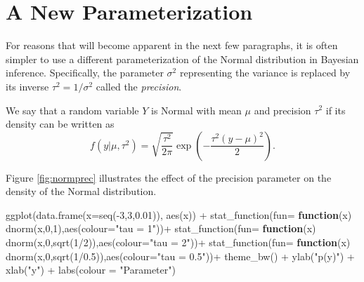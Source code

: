 \documentclass[
]{book}
\newenvironment{Shaded}{\begin{snugshade}}{\end{snugshade}}
\newcommand{\AttributeTok}[1]{\textcolor[rgb]{0.77,0.63,0.00}{#1}}
\newcommand{\ControlFlowTok}[1]{\textcolor[rgb]{0.13,0.29,0.53}{\textbf{#1}}}
\newcommand{\DecValTok}[1]{\textcolor[rgb]{0.00,0.00,0.81}{#1}}
\newcommand{\FloatTok}[1]{\textcolor[rgb]{0.00,0.00,0.81}{#1}}
\newcommand{\FunctionTok}[1]{\textcolor[rgb]{0.00,0.00,0.00}{#1}}
\newcommand{\NormalTok}[1]{#1}
\newcommand{\SpecialCharTok}[1]{\textcolor[rgb]{0.00,0.00,0.00}{#1}}
\newcommand{\StringTok}[1]{\textcolor[rgb]{0.31,0.60,0.02}{#1}}
\begin{document}
\hypertarget{a-new-parameterization}{%
\section{A New Parameterization}\label{a-new-parameterization}}

For reasons that will become apparent in the next few paragraphs, it is often simpler to use a different parameterization of the Normal distribution in Bayesian inference. Specifically, the parameter \(\sigma^2\) representing the variance is replaced by its inverse \(\tau^2=1/\sigma^2\) called the \emph{precision}.

We say that a random variable \(Y\) is Normal with mean \(\mu\) and precision \(\tau^2\) if its density can be written as
\[
f(y|\mu,\tau^2)=\sqrt{\frac{\tau^2}{2\pi}}\exp\left(-\frac{\tau^2(y-\mu)^2}{2}\right).
\]

Figure \ref{fig:normprec} illustrates the effect of the precision parameter on the density of the Normal distribution.

\begin{Shaded}
\begin{Highlighting}[]
\FunctionTok{ggplot}\NormalTok{(}\FunctionTok{data.frame}\NormalTok{(}\AttributeTok{x=}\FunctionTok{seq}\NormalTok{(}\SpecialCharTok{{-}}\DecValTok{3}\NormalTok{,}\DecValTok{3}\NormalTok{,}\FloatTok{0.01}\NormalTok{)), }\FunctionTok{aes}\NormalTok{(x)) }\SpecialCharTok{+}
  \FunctionTok{stat\_function}\NormalTok{(}\AttributeTok{fun=} \ControlFlowTok{function}\NormalTok{(x) }\FunctionTok{dnorm}\NormalTok{(x,}\DecValTok{0}\NormalTok{,}\DecValTok{1}\NormalTok{),}\FunctionTok{aes}\NormalTok{(}\AttributeTok{colour=}\StringTok{"tau = 1"}\NormalTok{))}\SpecialCharTok{+}
  \FunctionTok{stat\_function}\NormalTok{(}\AttributeTok{fun=} \ControlFlowTok{function}\NormalTok{(x) }\FunctionTok{dnorm}\NormalTok{(x,}\DecValTok{0}\NormalTok{,}\FunctionTok{sqrt}\NormalTok{(}\DecValTok{1}\SpecialCharTok{/}\DecValTok{2}\NormalTok{)),}\FunctionTok{aes}\NormalTok{(}\AttributeTok{colour=}\StringTok{"tau = 2"}\NormalTok{))}\SpecialCharTok{+}
  \FunctionTok{stat\_function}\NormalTok{(}\AttributeTok{fun=} \ControlFlowTok{function}\NormalTok{(x) }\FunctionTok{dnorm}\NormalTok{(x,}\DecValTok{0}\NormalTok{,}\FunctionTok{sqrt}\NormalTok{(}\DecValTok{1}\SpecialCharTok{/}\FloatTok{0.5}\NormalTok{)),}\FunctionTok{aes}\NormalTok{(}\AttributeTok{colour=}\StringTok{"tau = 0.5"}\NormalTok{))}\SpecialCharTok{+}
  \FunctionTok{theme\_bw}\NormalTok{() }\SpecialCharTok{+} \FunctionTok{ylab}\NormalTok{(}\StringTok{"p(y)"}\NormalTok{) }\SpecialCharTok{+} \FunctionTok{xlab}\NormalTok{(}\StringTok{"y"}\NormalTok{) }\SpecialCharTok{+} \FunctionTok{labs}\NormalTok{(}\AttributeTok{colour =} \StringTok{"Parameter"}\NormalTok{)}
\end{Highlighting}
\end{Shaded}
\end{document}

